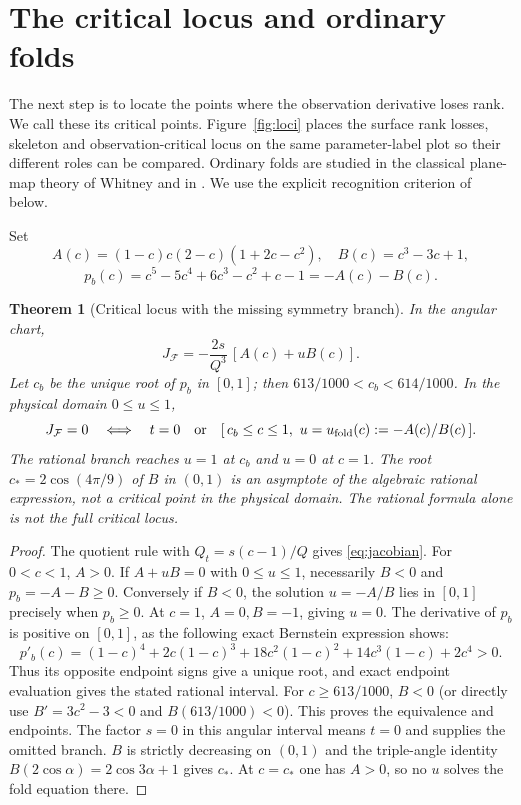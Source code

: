 \documentclass[11pt,a4paper]{article}
\newtheorem{theorem}{Theorem}[section]
\theoremstyle{definition}\newtheorem{definition}[theorem]{Definition}
\theoremstyle{remark}\newtheorem{remark}[theorem]{Remark}
\newcommand{\Map}{\mathcal F}\newcommand{\Pcore}{\mathcal P}
\begin{document}
\section{The critical locus and ordinary folds}\label{sec:folds}
The next step is to locate the points where the observation derivative
loses rank. We call these its critical points. Figure~\ref{fig:loci} places the
surface rank losses, skeleton and observation-critical locus on the same
parameter-label plot so their different roles can be compared. Ordinary
folds are studied in the classical plane-map theory of Whitney
\cite{whitney} and in \cite{gg}. We use the explicit recognition criterion
of \cite[Theorem 3.4(1)]{ishikawa} below.

Set
\[
 A(c)=(1-c)c(2-c)(1+2c-c^2),\quad B(c)=c^3-3c+1,
\]
\[
 p_b(c)=c^5-5c^4+6c^3-c^2+c-1=-A(c)-B(c).
\]
\begin{theorem}[Critical locus with the missing symmetry branch]\label{thm:critical}
In the angular chart,
\begin{equation}\label{eq:jacobian}
 J_{\Map}=-\frac{2s}{Q^3}\,[A(c)+uB(c)].
\end{equation}
Let $c_b$ be the unique root of $p_b$ in $[0,1]$; then
$613/1000<c_b<614/1000$. In the physical domain $0\leq u\leq1$,
\begin{equation}\label{eq:critical}
 J_{\Map}=0\quad\Longleftrightarrow\quad
 t=0\quad\text{or}\quad
 [\,c_b\leq c\leq1,\ u=u_{\rm fold}(c):=-A(c)/B(c)\,].
\end{equation}
The rational branch reaches $u=1$ at $c_b$ and $u=0$ at $c=1$.
The root $c_*=2\cos(4\pi/9)$ of $B$ in $(0,1)$ is an asymptote of
the algebraic rational expression, not a critical point in the physical
domain. The rational formula alone is not the full critical locus.
\end{theorem}
\begin{proof}
The quotient rule with $Q_t=s(c-1)/Q$ gives
\eqref{eq:jacobian}. For $0<c<1$, $A>0$. If $A+uB=0$ with
$0\leq u\leq1$, necessarily $B<0$ and $p_b=-A-B\geq0$.
Conversely if $B<0$, the solution $u=-A/B$ lies in $[0,1]$ precisely
when $p_b\geq0$. At $c=1$, $A=0,B=-1$, giving $u=0$.
The derivative of $p_b$ is positive on $[0,1]$, as the following exact
Bernstein expression shows:
\[
 p'_b(c)=(1-c)^4+2c(1-c)^3+18c^2(1-c)^2+14c^3(1-c)+2c^4>0.
\]
Thus its opposite endpoint signs give a unique root, and exact endpoint
evaluation gives the stated rational interval. For $c\geq613/1000$,
$B<0$ (or directly use $B'=3c^2-3<0$ and $B(613/1000)<0$).
This proves the equivalence and endpoints. The factor $s=0$ in this
angular interval means $t=0$ and supplies the omitted branch.
$B$ is strictly decreasing on $(0,1)$ and the triple-angle identity
$B(2\cos\alpha)=2\cos3\alpha+1$ gives $c_*$.
At $c=c_*$ one has $A>0$, so no $u$ solves the fold equation there.
\end{proof}
\end{document}
